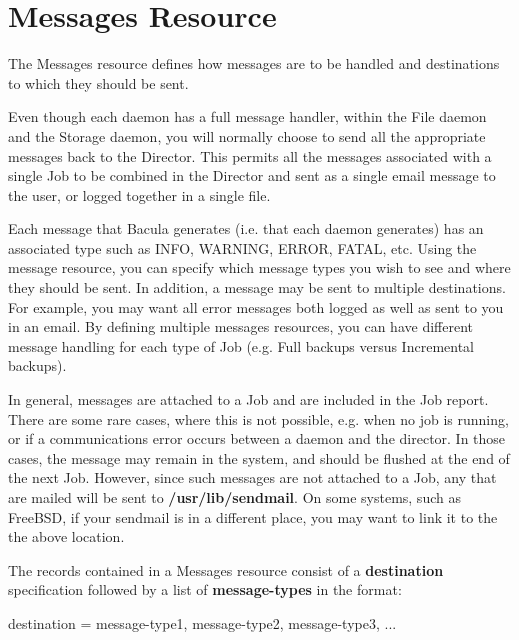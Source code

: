 
\chapter{Messages Resource}
\label{MessagesChapter}

The Messages resource defines how messages are to be handled and destinations
to which they should be sent. 

Even though each daemon has a full message handler, within the File daemon and
the Storage daemon, you will normally choose to send all the appropriate
messages back to the Director.  This permits all the messages associated with
a single Job to be combined in the Director and sent as a single email message
to the user, or logged together in a single file.

Each message that Bacula generates (i.e. that each daemon generates) has an
associated type such as INFO, WARNING, ERROR, FATAL, etc. Using the message
resource, you can specify which message types you wish to see and where they
should be sent. In addition, a message may be sent to multiple destinations.
For example, you may want all error messages both logged as well as sent to
you in an email. By defining multiple messages resources, you can have
different message handling for each type of Job (e.g. Full backups versus
Incremental backups). 

In general, messages are attached to a Job and are included in the Job report.
There are some rare cases, where this is not possible, e.g. when no job is
running, or if a communications error occurs between a daemon and the
director. In those cases, the message may remain in the system, and should be
flushed at the end of the next Job. However, since such messages are not
attached to a Job, any that are mailed will be sent to {\bf
/usr/lib/sendmail}. On some systems, such as FreeBSD, if your sendmail is in a
different place, you may want to link it to the the above location. 

The records contained in a Messages resource consist of a {\bf destination}
specification followed by a list of {\bf message-types} in the format: 

\begin{description}

\item [destination = message-type1, message-type2, message-type3, ...  ]
\end{description}

